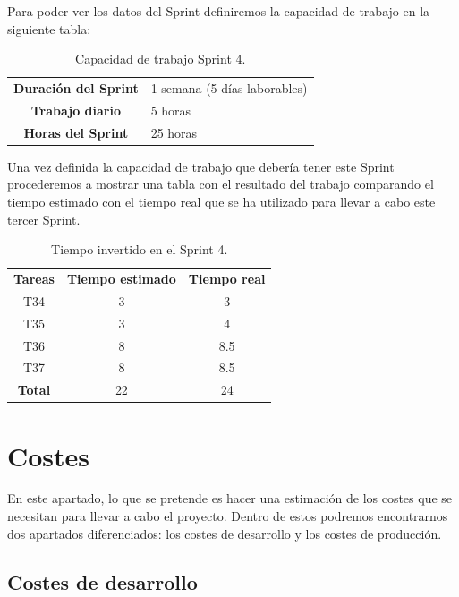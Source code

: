 Para poder ver los datos del Sprint definiremos la capacidad de trabajo en la siguiente tabla:

\begin{table}[H]
	\begin{center}
		\begin{tabular}{| c | p{9cm} |}
			\hline
			
			\textbf{Duración del Sprint} & 1 semana (5 días laborables) \\
			\textbf{Trabajo diario} & 5 horas \\
			\textbf{Horas del Sprint} & 25 horas \\ \hline
		\end{tabular}
		\caption{Capacidad de trabajo Sprint 4.}
	\end{center}
\end{table}

Una vez definida la capacidad de trabajo que debería tener este Sprint procederemos a mostrar una tabla con el resultado del trabajo comparando el tiempo estimado con el tiempo real que se ha utilizado para llevar a cabo este tercer Sprint.

\begin{table}[H]
	\begin{center}
		\begin{tabular}{| c | c | c |}
			\hline
			
			\textbf{Tareas} & \textbf{Tiempo estimado} & \textbf{Tiempo real} \\
			T34 & 3 & 3 \\
			T35 & 3 & 4 \\
			T36 & 8 & 8.5 \\
			T37 & 8 & 8.5 \\
			\textbf{Total} & 22 & 24 \\ \hline
		\end{tabular}
		\caption{Tiempo invertido en el Sprint 4.}
	\end{center}
\end{table} 

\section{Costes}

En este apartado, lo que se pretende es hacer una estimación de los costes que se necesitan para llevar a cabo el proyecto. Dentro de estos podremos encontrarnos dos apartados diferenciados: los costes de desarrollo y los costes de producción.

\subsection{Costes de desarrollo}

